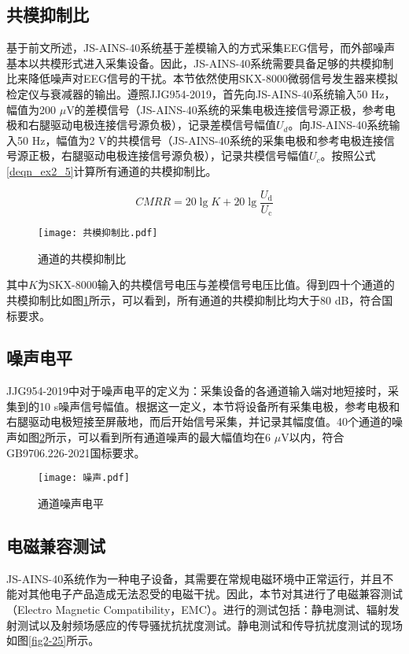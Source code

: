 \subsection{共模抑制比}

基于前文所述，JS-AINS-40系统基于差模输入的方式采集EEG信号，而外部噪声基本以共模形式进入采集设备。因此，JS-AINS-40系统需要具备足够的共模抑制比来降低噪声对EEG信号的干扰。本节依然使用SKX-8000微弱信号发生器来模拟检定仪与衰减器的输出。遵照JJG954-2019，首先向JS-AINS-40系统输入50 Hz，幅值为200 $\mu$V的差模信号（JS-AINS-40系统的采集电极连接信号源正极，参考电极和右腿驱动电极连接信号源负极），记录差模信号幅值$U_d$。向JS-AINS-40系统输入50 Hz，幅值为2 V的共模信号（JS-AINS-40系统的采集电极和参考电极连接信号源正极，右腿驱动电极连接信号源负极），记录共模信号幅值$U_c$。按照公式\ref{deqn_ex2_5}计算所有通道的共模抑制比。

\begin{equation}
    \label{deqn_ex2_5}
    C M R R = 20 \lg K + 20 \lg\frac{U_{\mathrm{d}}}{U_{\mathrm{c}}}
\end{equation}

\begin{figure}[!h]
	\centering
	\texttt{[image: 共模抑制比.pdf]}
	\caption{通道的共模抑制比} 
	\label{fig2-23}
\end{figure}
其中$K$为SKX-8000输入的共模信号电压与差模信号电压比值。得到四十个通道的共模抑制比如图\ref{fig2-23}所示，可以看到，所有通道的共模抑制比均大于80 dB，符合国标要求。



\subsection{噪声电平}
JJG954-2019中对于噪声电平的定义为：采集设备的各通道输入端对地短接时，采集到的10 s噪声信号幅值。根据这一定义，本节将设备所有采集电极，参考电极和右腿驱动电极短接至屏蔽地，而后开始信号采集，并记录其幅度值。40个通道的噪声如图\ref{fig2-24}所示，可以看到所有通道噪声的最大幅值均在6 $\mu$V以内，符合GB9706.226-2021国标要求。
\begin{figure}[!h]
	\centering
	\texttt{[image: 噪声.pdf]}
	\caption{通道噪声电平} 
	\label{fig2-24}
\end{figure}

\subsection{电磁兼容测试}
JS-AINS-40系统作为一种电子设备，其需要在常规电磁环境中正常运行，并且不能对其他电子产品造成无法忍受的电磁干扰。因此，本节对其进行了电磁兼容测试（Electro Magnetic Compatibility，EMC）。进行的测试包括：静电测试、辐射发射测试以及射频场感应的传导骚扰抗扰度测试。静电测试和传导抗扰度测试的现场如图\ref{fig2-25}所示。

